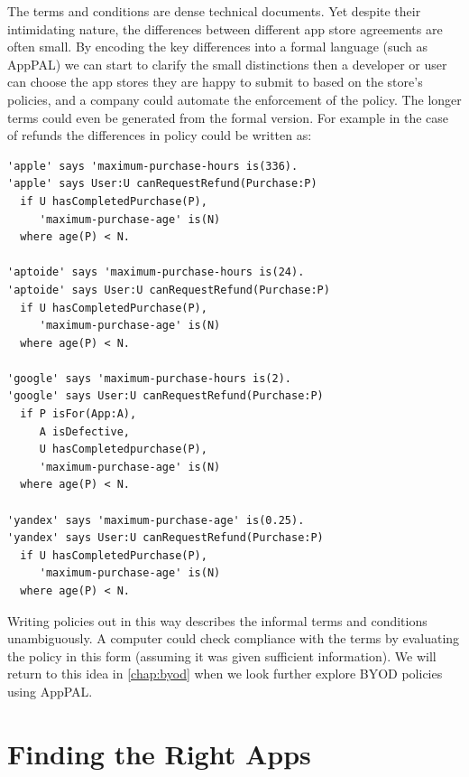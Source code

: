 \documentclass[thesis.tex]{subfiles}
\begin{document}
The terms and conditions are dense technical documents.  Yet despite
their intimidating nature, the differences between different app store
agreements are often small.  By encoding the key differences into a
formal language (such as AppPAL) we can start to clarify the small
distinctions then a developer or user can choose the app stores they
are happy to submit to based on the store's policies, and a company
could automate the enforcement of the policy.  The longer terms could
even be generated from the formal version.  For example in the case of
refunds the differences in policy could be written as:

\begin{lstlisting}
'apple' says 'maximum-purchase-hours is(336).
'apple' says User:U canRequestRefund(Purchase:P)
  if U hasCompletedPurchase(P),
     'maximum-purchase-age' is(N)
  where age(P) < N.

'aptoide' says 'maximum-purchase-hours is(24).
'aptoide' says User:U canRequestRefund(Purchase:P)
  if U hasCompletedPurchase(P),
     'maximum-purchase-age' is(N)
  where age(P) < N.

'google' says 'maximum-purchase-hours is(2).
'google' says User:U canRequestRefund(Purchase:P)
  if P isFor(App:A),
     A isDefective,
     U hasCompletedpurchase(P),
     'maximum-purchase-age' is(N)
  where age(P) < N.

'yandex' says 'maximum-purchase-age' is(0.25).
'yandex' says User:U canRequestRefund(Purchase:P)
  if U hasCompletedPurchase(P),
     'maximum-purchase-age' is(N)
  where age(P) < N.
\end{lstlisting}

Writing policies out in this way describes the informal terms and
conditions unambiguously.  A computer could check compliance with the
terms by evaluating the policy in this form (assuming it was given
sufficient information). We will return to this idea in
\autoref{chap:byod} when we look further explore BYOD policies using AppPAL.

\section{Finding the Right Apps}
\end{document}
